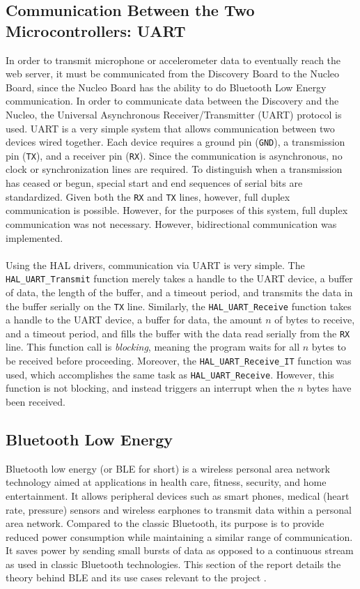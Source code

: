 \subsection{Communication Between the Two Microcontrollers: UART}
In order to transmit microphone or accelerometer data to eventually reach the web server, it must be
communicated from the Discovery Board to the Nucleo Board, since the Nucleo Board has the ability to
do Bluetooth Low Energy communication. In order to communicate data between the Discovery and the
Nucleo, the Universal Asynchronous Receiver/Transmitter (UART) protocol is used. UART is a very
simple system that allows communication between two devices wired together. Each device requires a
ground pin (\texttt{GND}), a transmission pin (\texttt{TX}), and a receiver pin (\texttt{RX}). Since
the communication is asynchronous, no clock or synchronization lines are required. To distinguish
when a transmission has ceased or begun, special start and end sequences of serial bits are
standardized. Given both the \texttt{RX} and \texttt{TX} lines, however, full duplex communication
is possible. However, for the purposes of this system, full duplex communication was not necessary.
However, bidirectional communication was implemented.\\\\
Using the HAL drivers, communication via UART is very simple. The \texttt{HAL\_UART\_Transmit}
function merely takes a handle to the UART device, a buffer of data, the length of the buffer, and a
timeout period, and transmits the data in the buffer serially on the \texttt{TX} line. Similarly, the
\texttt{HAL\_UART\_Receive} function takes a handle to the UART device, a buffer for data, the
amount $n$ of bytes to receive, and a
timeout period, and fills the buffer with the data read serially from the \texttt{RX} line. This
function call is \textit{blocking}, meaning the program waits for all $n$ bytes to be received before
proceeding. Moreover, the \texttt{HAL\_UART\_Receive\_IT} function was used, which accomplishes the
same task as \texttt{HAL\_UART\_Receive}. However, this function is not blocking, and instead
triggers an interrupt when the $n$ bytes have been received.
\subsection{Bluetooth Low Energy}

Bluetooth low energy (or BLE for short) is a wireless personal area network technology aimed at applications in health care, fitness, security, and home entertainment. 
It allows peripheral devices such as smart phones, medical (heart rate, pressure) sensors and wireless earphones to transmit data within a personal area network. 
Compared to the classic Bluetooth, its purpose is to provide reduced power consumption while maintaining a similar range of communication. 
It saves power by sending small bursts of data as opposed to a continuous stream as used in classic Bluetooth technologies. 
This section of the report details the theory behind BLE and its use cases relevant to the project \cite{gatt}.\\

